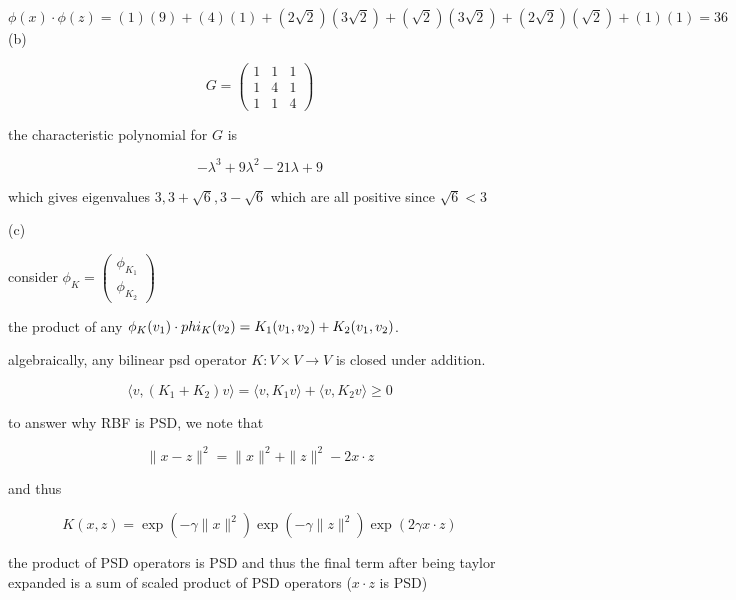 \documentclass{report}
\begin{document}
\begin{equation}
    \phi(x) \cdot \phi(z) = (1)(9) + (4)(1) + (2\sqrt{2})(3\sqrt{2}) + (\sqrt{2})(3\sqrt{2}) + (2\sqrt{2})(\sqrt{2}) + (1)(1) = 36
\end{equation}
(b)

\begin{equation}
    G =  \begin{pmatrix} 
        1 & 1 & 1 \\ 
        1 & 4 & 1 \\ 
        1 & 1 & 4 
    \end{pmatrix}
\end{equation}

the characteristic polynomial for \(G\) is 

\begin{equation}
    -\lambda^3 + 9\lambda^2 - 21\lambda + 9
\end{equation}

which gives eigenvalues \(3,3+\sqrt{6}, 3-\sqrt{6}\)
which are all positive since \(\sqrt{6}<3\)

(c)

consider \(\phi_K = \begin{pmatrix}
    \phi_{K_1}\\
    \phi_{K_2}
\end{pmatrix}\)

the product of any \(\phi_K(v_1)\cdot\\phi_K(v_2) =K_1(v_1,v_2) + K_2(v_1,v_2)\). 

algebraically, any bilinear psd operator \(K:V\times V\to V\) is closed under addition. 

\begin{equation}
    \langle v, (K_1 + K_2)v \rangle = \langle v, K_1 v \rangle + \langle v, K_2 v \rangle \geq 0
\end{equation}

to answer why RBF is PSD, we note that 

\begin{equation}
    \|x - z\|^2 = \|x\|^2 + \|z\|^2 - 2x \cdot z
\end{equation}

and thus

\begin{equation}
    K(x, z) = \exp(-\gamma \|x\|^2) \exp(-\gamma \|z\|^2) \exp(2\gamma x \cdot z)
\end{equation}

the product of PSD operators is PSD and thus the final term after being taylor expanded is a sum of scaled product of PSD operators (\(x\cdot z \) is PSD)
\end{document}
